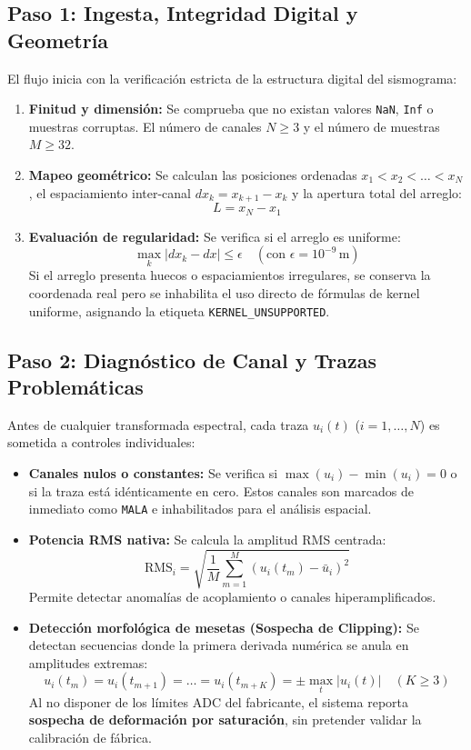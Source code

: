 \documentclass[11pt,a4paper]{article}
\begin{document}
\subsection{Paso 1: Ingesta, Integridad Digital y Geometría}
El flujo inicia con la verificación estricta de la estructura digital del sismograma:
\begin{enumerate}
    \item \textbf{Finitud y dimensión:} Se comprueba que no existan valores \texttt{NaN}, \texttt{Inf} o muestras corruptas. El número de canales $N \ge 3$ y el número de muestras $M \ge 32$.
    \item \textbf{Mapeo geométrico:} Se calculan las posiciones ordenadas $x_1 < x_2 < \dots < x_N$, el espaciamiento inter-canal $dx_k = x_{k+1} - x_k$ y la apertura total del arreglo:
    \begin{equation}
        L = x_N - x_1
    \end{equation}
    \item \textbf{Evaluación de regularidad:} Se verifica si el arreglo es uniforme:
    \begin{equation}
        \max_k |dx_k - dx| \le \epsilon \quad (\text{con } \epsilon = 10^{-9}\,\text{m})
    \end{equation}
    Si el arreglo presenta huecos o espaciamientos irregulares, se conserva la coordenada real pero se inhabilita el uso directo de fórmulas de kernel uniforme, asignando la etiqueta \texttt{KERNEL\_UNSUPPORTED}.
\end{enumerate}

\subsection{Paso 2: Diagnóstico de Canal y Trazas Problemáticas}
Antes de cualquier transformada espectral, cada traza $u_i(t)$ ($i=1,\dots,N$) es sometida a controles individuales:
\begin{itemize}
    \item \textbf{Canales nulos o constantes:} Se verifica si $\max(u_i) - \min(u_i) = 0$ o si la traza está idénticamente en cero. Estos canales son marcados de inmediato como \texttt{MALA} e inhabilitados para el análisis espacial.
    \item \textbf{Potencia RMS nativa:} Se calcula la amplitud RMS centrada:
    \begin{equation}
        \text{RMS}_i = \sqrt{\frac{1}{M} \sum_{m=1}^{M} \left( u_i(t_m) - \bar{u}_i \right)^2 }
    \end{equation}
    Permite detectar anomalías de acoplamiento o canales hiperamplificados.
    \item \textbf{Detección morfológica de mesetas (Sospecha de Clipping):} Se detectan secuencias donde la primera derivada numérica se anula en amplitudes extremas:
    \begin{equation}
        u_i(t_m) = u_i(t_{m+1}) = \dots = u_i(t_{m+K}) = \pm \max_t |u_i(t)| \quad (K \ge 3)
    \end{equation}
    Al no disponer de los límites ADC del fabricante, el sistema reporta \textbf{sospecha de deformación por saturación}, sin pretender validar la calibración de fábrica.
\end{itemize}
\end{document}
